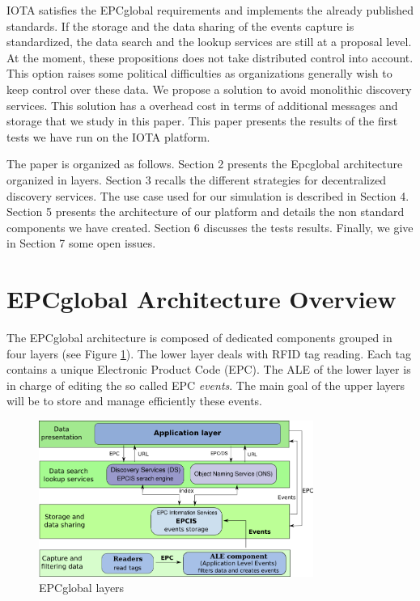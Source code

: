 \documentclass[a4paper]{llncs}
\begin{document}
IOTA satisfies the EPCglobal requirements and implements the already published standards.
If the storage and the data sharing of the events capture is standardized, the
data search and the lookup services are still at a proposal level. At the
moment, these propositions does not take distributed control into account. This
option raises some political difficulties as organizations generally wish to
keep control over these data.
We propose a solution to avoid monolithic discovery services. This solution
has a overhead cost in terms of  additional messages and storage that we study
in this paper. 
This paper presents the results of the first tests we have run on the IOTA platform.  

The paper is organized as follows. Section 2 presents the Epcglobal
architecture organized in layers. Section 3 recalls the different strategies
for decentralized discovery services. The use case used for our simulation is
described in Section 4. Section 5 presents the architecture of our platform and
details the non standard components we have created. Section 6 discusses the
tests results. Finally, we give in Section 7 some open issues.
   
\section{EPCglobal Architecture Overview}
\label{sec:epcglobalarch}


The EPCglobal architecture is composed of dedicated components grouped in four
layers (see Figure \ref{fig:epcgloblalayers}). The lower layer deals with RFID
tag reading. Each tag contains a unique Electronic Product Code (EPC). The ALE
of the lower layer is in charge of editing the so called EPC \emph{events}. The
main goal of the upper layers will be to store and manage efficiently these
events.

\begin{figure}[htbp]
  \centering
  \includegraphics[width=0.8\textwidth]{iota_visuel/epcglobal_archi.png}
  \caption{EPCglobal layers}
  \label{fig:epcgloblalayers}
\end{figure}
\end{document}

